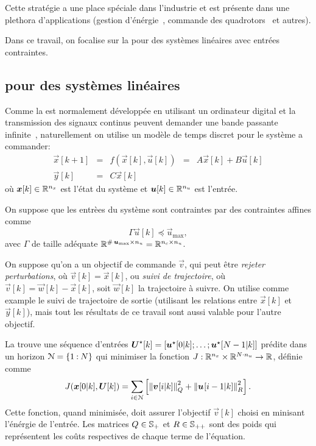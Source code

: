 \documentclass[../main.tex]{subfiles}
\begin{document}
Cette stratégie a une place spéciale dans l'industrie et est présente dans une plethora d'applications (gestion d'énérgie~\cite{AnandutaEtAl2018}, commande des quadrotors~\cite{BanguraMahony2014} et autres).

Dans ce travail, on focalise sur la \mpc{} pour des systèmes linéaires avec entrées contraintes.

\subsection{\mpc{} pour des systèmes linéaires}\label{sec:mpc-pour-des}
Comme la \mpc{} est normalement développée en utilisant un ordinateur digital et la transmission des signaux continus peuvent demander une bande passante infinite~\cite{HeEtAl2022}, naturellement on utilise un modèle de temps discret pour le système a commander:
\begin{equation}\label{eq:large_scale_system_model_fr}
  \begin{array}{rclll}
    \vec{x}[k+1]&=&f(\vec{x}[k],\vec{u}[k])&=&A\vec{x}[k]+B\vec{u}[k]\\
    \vec{y}[k]&=&C\vec{x}[k]&&
  \end{array}
\end{equation}
où $\boldsymbol{x}[k]\in\mathbb{R}^{n_{x}}$ est l'état du système et $\boldsymbol{u}[k]\in\mathbb{R}^{n_{u}}$ est l'entrée.

On suppose que les entrèes du système sont contraintes par des contraintes affines comme
\begin{equation}
  \label{eq:linear_constraint_fr}
  \Gamma\vec{u}[k]\preceq\vec{u}_{\max},
\end{equation}
avec $\Gamma$ de taille adéquate $\mathbb{R}^{\operatorname{\#}{\boldsymbol{u}_{\max}}\times n_{u} }=\mathbb{R}^{n_{c}\times n_{u} }$.

On suppose qu'on a un objectif de commande $\vec{v}$,
qui peut être \emph{rejeter perturbations}, où ${ \vec{v}[k]=\vec{x}[k] }$, ou \emph{suivi de trajectoire}, où ${ \vec{v}[k]=\vec{w}[k]-\vec{x}[k] }$, soit $\vec{w}[k]$ la trajectoire à suivre.
On utilise comme example le suivi de trajectoire de sortie (utilisant les relations entre $\vec{x}[k]$ et $\vec{y}[k]$), mais tout les résultats de ce travail sont aussi valable pour l'autre objectif.

La \mpc{} trouve une séquence d'entrées ${\boldsymbol{U}^{\star}[k]=[\boldsymbol{u}^{\star}[0|k];\dots; \boldsymbol{u}^{\star}[N-1|k]]}$ prédite dans un horizon $\mathcal{N}=\{1\mathbin{:}N\}$ qui minimiser la fonction ${J:\mathbb{R}^{n_{x}}\times\mathbb{R}^{N\cdot n_{u}}\to \mathbb{R}}$, définie comme
\begin{equation}
  \label{eq:quadratic_objective_with_sum_fr}
  J(\vec{x}[0|k],\vec{U}[k])=\sum_{i\in\predictionSet}\left[\norm{\mpcvec{v}[ ][i][k]}^{2}_{Q} +\norm{\mpcvec{u}[ ][i-1][k]}^{2}_{R}\right].
\end{equation}
Cette fonction, quand minimisée, doit assurer l'objectif $\vec{v}[k]$ choisi en minisant l'énérgie de l'entrée.
Les matrices ${ Q\in\mathbb{S}_{+} }$ et ${ R\in\mathbb{S}_{++} }$ sont des poids qui représentent les coûts respectives de chaque terme de l'équation.
\end{document}

